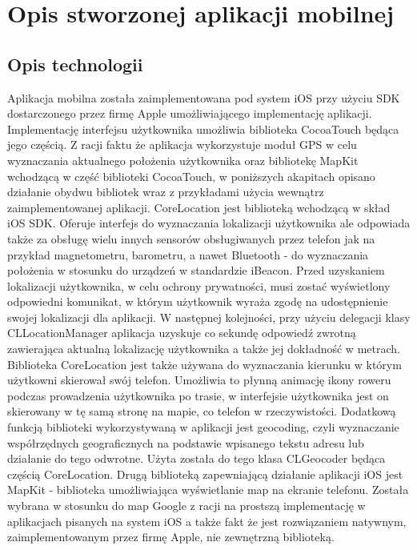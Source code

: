 \section{Opis stworzonej aplikacji mobilnej}

\subsection{Opis technologii}

Aplikacja mobilna została zaimplementowana pod system iOS przy użyciu SDK dostarczonego przez firmę Apple umożliwiającego implementację aplikacji. Implementację interfejsu użytkownika umożliwia biblioteka CocoaTouch będąca jego częścią. Z racji faktu że aplikacja wykorzystuje moduł GPS w celu wyznaczania aktualnego położenia użytkownika oraz bibliotekę MapKit wchodzącą w część biblioteki CocoaTouch, w poniższych akapitach opisano działanie obydwu bibliotek wraz z przykładami użycia wewnątrz zaimplementowanej aplikacji.
CoreLocation jest biblioteką wchodzącą w skład iOS SDK. Oferuje interfejs do wyznaczania lokalizacji użytkownika ale odpowiada także za obsługę wielu innych sensorów obsługiwanych przez telefon jak na przykład magnetometru, barometru, a nawet Bluetooth - do wyznaczania położenia w stosunku do urządzeń w standardzie iBeacon. Przed uzyskaniem lokalizacji użytkownika, w celu ochrony prywatności, musi zostać wyświetlony odpowiedni komunikat, w którym użytkownik wyraża zgodę na udostępnienie swojej lokalizacji dla aplikacji. W następnej kolejności, przy użyciu delegacji klasy CLLocationManager aplikacja uzyskuje co sekundę odpowiedź zwrotną zawierająca aktualną lokalizację użytkownika a także jej dokładność w metrach. Biblioteka CoreLocation jest także używana do wyznaczania kierunku w którym użytkowni skierował swój telefon. Umożliwia to płynną animację ikony roweru podczas prowadzenia użytkownika po trasie, w interfejsie użytkownika jest on skierowany w tę samą stronę na mapie, co telefon w rzeczywistości. Dodatkową funkcją biblioteki wykorzystywaną w aplikacji jest geocoding, czyli wyznaczanie współrzędnych geograficznych na podstawie wpisanego tekstu adresu lub działanie do tego odwrotne. Użyta została do tego klasa CLGeocoder będąca częścią CoreLocation.
Drugą biblioteką zapewniającą działanie aplikacji iOS jest MapKit - biblioteka umożliwiająca wyświetlanie map na ekranie telefonu. Została wybrana w stosunku do map Google z racji na prostszą implementację w aplikacjach pisanych na system iOS a także fakt że jest rozwiązaniem natywnym, zaimplementowanym przez firmę Apple, nie zewnętrzną biblioteką.

